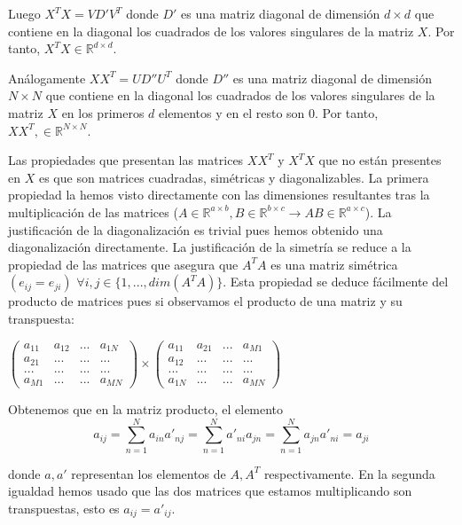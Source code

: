 \documentclass{article}
\begin{document}
	
	Luego $X^TX = V D' V^T$ donde $D'$ es una matriz diagonal de dimensión $d \times d$ que contiene en la diagonal los cuadrados de los valores singulares de la matriz $X$. Por tanto, $X^TX \in \mathbb{R}^{d \times d}$.
	
	Análogamente $XX^T = U D'' U^T$ donde $D''$ es una matriz diagonal de dimensión $N \times N$ que contiene en la diagonal los cuadrados de los valores singulares de la matriz $X$ en los primeros $d$ elementos y en el resto son 0. Por tanto, $XX^T ,\in \mathbb{R}^{N \times N}$.
	
	Las propiedades que presentan las matrices $XX^T$ y $X^TX$ que no están presentes en $X$ es que son matrices cuadradas, simétricas y diagonalizables. La primera propiedad la hemos visto directamente con las dimensiones resultantes tras la multiplicación de las matrices ($A \in \mathbb{R}^{a \times b}, B \in \mathbb{R}^{b \times c} \rightarrow AB \in \mathbb{R}^{a \times c}$). La justificación de la diagonalización es trivial pues hemos obtenido una diagonalización directamente. La justificación de la simetría se reduce a la propiedad de las matrices que asegura que $A^T A$ es una matriz simétrica $(e_{ij} = e_{ji})$ $\forall i,j \in \{1,..., dim(A^TA)\}$.  Esta propiedad se deduce fácilmente del producto de matrices pues si observamos el producto de una matriz y su transpuesta:
	
		\begin{center}
		$
		\left(\begin{smallmatrix}
		a_{11} & a_{12} & ... & a_{1N}\\
		a_{21} & ... & ... & ...\\
		... &... & ... & ... \\
		a_{M1} & ... & ... & a_{MN}
		\end{smallmatrix}\right)
		\times
		\left(\begin{smallmatrix}
		a_{11} & a_{21} & ... & a_{M1}\\
		a_{12} & ... & ... & ...\\
		... &... & ... & ... \\
		a_{1N} & ... & ... & a_{MN}
		\end{smallmatrix}\right)
		$
	\end{center}
	
	Obtenemos que en la matriz producto, el elemento \[a_{ij} = \sum_{ n = 1}^{N} a_{in}a'_{nj} = \sum_{ n = 1}^{N} a'_{ni}a_{jn} = \sum_{ n = 1}^{N} a_{jn}a'_{ni} =  a_{ji}\] 

	donde $a, a'$ representan los elementos de $A, A^T$ respectivamente. En la segunda igualdad hemos usado que las dos matrices que estamos multiplicando son transpuestas, esto es $a_{ij} = a'_{ij}$.
	
\end{document}
